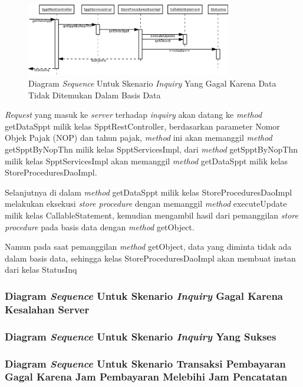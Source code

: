 \documentclass[pdftex,12pt, oneside]{article}
\begin{document}
\begin{figure}[H]
  \centering
  \includegraphics[width=0.8\textwidth]{./resources/uml/uml-seq-inq-not-any}
  \caption{Diagram \textit{Sequence} Untuk Skenario \textit{Inquiry} Yang Gagal Karena Data Tidak Ditemukan Dalam Basis Data}
  \label{fig:uml-seq-inq-not-any}
\end{figure}

\textit{Request} yang masuk ke \textit{server} terhadap \textit{inquiry} akan datang ke \textit{method} getDataSppt milik kelas SpptRestController, berdasarkan parameter Nomor Objek Pajak (NOP) dan tahun pajak, \textit{method} ini akan memanggil \textit{method} getSpptByNopThn milik kelas SpptServicesImpl, dari \textit{method} getSpptByNopThn milik kelas SpptServicesImpl akan memanggil \textit{method} getDataSppt milik kelas StoreProceduresDaoImpl.

Selanjutnya di dalam \textit{method} getDataSppt milik kelas StoreProceduresDaoImpl melakukan eksekusi \textit{store procedure} dengan memanggil \textit{method} executeUpdate milik kelas CallableStatement, kemudian mengambil hasil dari pemanggilan \textit{store procedure} pada basis data dengan \textit{method} getObject.

Namun pada saat pemanggilan \textit{method} getObject, data yang diminta tidak ada dalam basis data, sehingga kelas StoreProceduresDaoImpl akan membuat instan dari kelas StatusInq

\subsubsection{Diagram \textit{Sequence} Untuk Skenario \textit{Inquiry} Gagal Karena Kesalahan Server}
\subsubsection{Diagram \textit{Sequence} Untuk Skenario \textit{Inquiry} Yang Sukses}
\subsubsection{Diagram \textit{Sequence} Untuk Skenario Transaksi Pembayaran Gagal Karena Jam Pembayaran Melebihi Jam Pencatatan}
\end{document}
